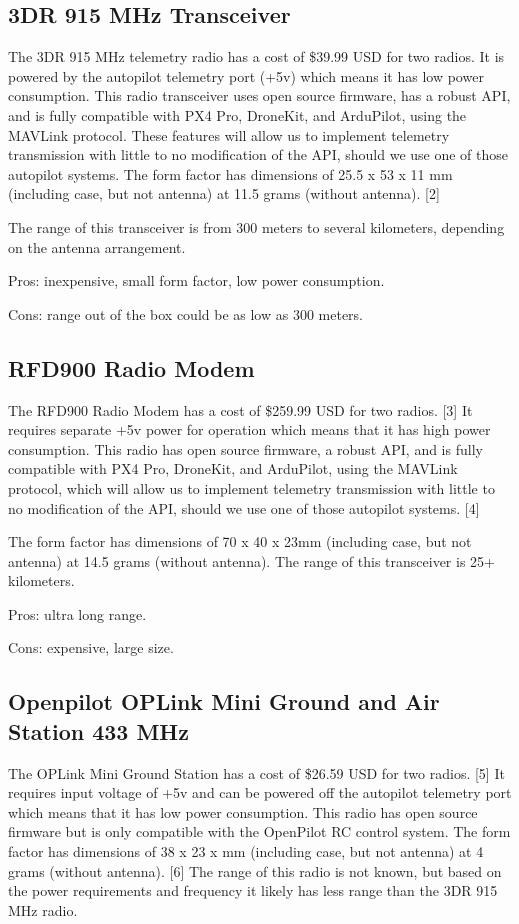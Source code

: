 \documentclass[compsoc,draftclsnofoot,onecolumn,10pt]{IEEEtran}
\begin{document}
\subsection{3DR 915 MHz Transceiver}

The 3DR 915 MHz telemetry radio has a cost of \$39.99 USD for two radios. It is
powered by the autopilot telemetry port (+5v) which means it has low power
consumption. This radio transceiver uses open source firmware, has a robust API,
and is fully compatible with PX4 Pro, DroneKit, and ArduPilot, using the MAVLink
protocol. These features will allow us to implement telemetry transmission with
little to no modification of the API, should we use one of those autopilot
systems.  The form factor has dimensions of 25.5 x 53 x 11 mm (including case,
but not antenna) at 11.5 grams (without antenna). [2]

The range of this transceiver is from 300 meters to several kilometers,
depending on the antenna arrangement.

Pros: inexpensive, small form factor, low power consumption.

Cons: range out of the box could be as low as 300 meters.


\subsection{RFD900 Radio Modem}

The RFD900 Radio Modem has a cost of \$259.99 USD for two radios. [3] It requires
separate +5v power for operation which means that it has high power
consumption. This radio has open source firmware, a robust API, and is fully
compatible with PX4 Pro, DroneKit, and ArduPilot, using the MAVLink protocol,
which will allow us to implement telemetry transmission with little to no
modification of the API, should we use one of those autopilot systems. [4]

The form factor has dimensions of 70 x 40 x 23mm (including case, but not
antenna) at 14.5 grams (without
antenna).
The range of this transceiver is 25+ kilometers.

Pros: ultra long range.

Cons: expensive, large size.


\subsection{Openpilot OPLink Mini Ground and Air Station 433 MHz}

The OPLink Mini Ground Station has a cost of \$26.59 USD for two radios. [5] It
requires input voltage of +5v and can be powered off the autopilot telemetry
port which means that it has low power consumption. This radio has open source
firmware but is only compatible with the OpenPilot RC control system. 
The form factor has dimensions of 38 x 23 x mm (including case, but not
antenna) at 4 grams (without antenna). [6]
The range of this radio is not known, but based on the power requirements and
frequency it likely has less range than the 3DR 915 MHz radio.
\end{document}
